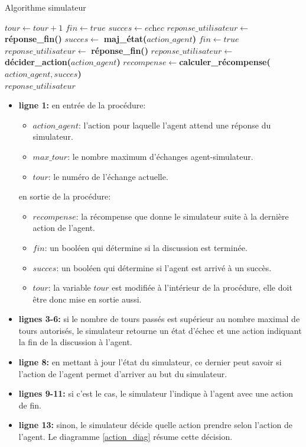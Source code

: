 \begin{algorithm}[H]
	\caption{Algorithme simulateur}\label{euclid}
	\begin{algorithmic}[1]
		\State $tour \gets tour+1$
		\State $fin \gets \textit{true}$
		\State $succes \gets \textit{echec}$
		\State $reponse\_utilisateur \gets $ \textbf{réponse\_fin()}
		\Else
		\State $succes \gets$ \textbf{maj\_état(}$action\_agent$\textbf{)}
		\State $fin \gets \textit{true}$
		\State $reponse\_utilisateur \gets $ \textbf{réponse\_fin()}
		\Else 
		\State $reponse\_utilisateur \gets $ \textbf{décider\_action(}$action\_agent$\textbf{)}
		\EndIf
		\EndIf
		\State $recompense \gets $\textbf{calculer\_récompense(}$action\_agent, succes$\textbf{)}\\
		\Return $reponse\_utilisateur$
		\EndProcedure
		
	\end{algorithmic}
\end{algorithm}
\begin{itemize}
	\item \textbf{ligne 1:} en entrée de la procédure:
	\begin{itemize}
		\item $action\_agent$: l'action pour laquelle l'agent attend une réponse du simulateur.
		\item $max\_tour$: le nombre maximum d'échanges agent-simulateur.
		\item $tour$: le numéro de l'échange actuelle.
	\end{itemize}
	en sortie de la procédure:
	\begin{itemize}
		\item $recompense$: la récompense que donne le simulateur suite à la dernière action de l'agent.
		\item $fin$: un booléen qui détermine si la discussion est terminée.
		\item $succes$: un booléen qui détermine si l'agent est arrivé à un succès.
		\item $tour$: la variable $tour$ est modifiée à l'intérieur de la procédure, elle doit être donc mise en sortie aussi.
	\end{itemize}
	\item \textbf{lignes 3-6:} si le nombre de tours passés est supérieur au nombre maximal de tours autorisés, le simulateur retourne un état d'échec et une action indiquant la fin de la discussion à l'agent.
	\item \textbf{ligne 8:} en mettant à jour l'état du simulateur, ce dernier peut savoir si l'action de l'agent permet d'arriver au but du simulateur.
	\item \textbf{lignes 9-11:} si c'est le cas, le simulateur l'indique à l'agent avec une action de fin.
	\item \textbf{ligne 13:} sinon, le simulateur décide quelle action prendre selon l'action de l'agent. Le diagramme \ref{action_diag} résume cette décision.
\end{itemize}

